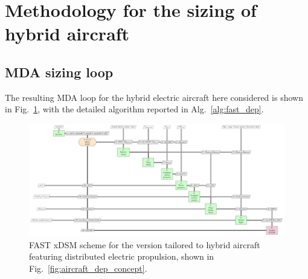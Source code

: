 \section{Methodology for the sizing of hybrid aircraft}
\label{sec:chap3_sizing_hybrid}

\subsection{MDA sizing loop}
\label{subsec:chap3_mda_hybrid}

The resulting MDA loop for the hybrid electric aircraft here considered is shown in Fig.~\ref{fig:fast_dep_xdsm}, with the detailed algorithm reported in Alg.~\ref{alg:fast_dep}. 
\begin{figure}[!h]
	\centering
	\includegraphics[keepaspectratio, width=1.3\textwidth, angle=90]{images/chap3/FAST_DEP}
	\caption{FAST xDSM scheme for the version tailored to hybrid aircraft featuring distributed electric propulsion, shown in Fig.~\ref{fig:aircraft_dep_concept}. }
	\label{fig:fast_dep_xdsm}
\end{figure}

